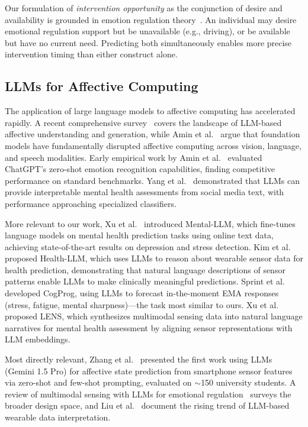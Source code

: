 \documentclass[screen,review,anonymous]{acmart}
\begin{document}
Our formulation of \emph{intervention opportunity} as the conjunction of desire and availability is grounded in emotion regulation theory~\cite{gross2015emotion_regulation, sheppes2015emotion_regulation, aldao2010emotion_regulation}. An individual may desire emotional regulation support but be unavailable (e.g., driving), or be available but have no current need. Predicting both simultaneously enables more precise intervention timing than either construct alone.

\subsection{LLMs for Affective Computing}

The application of large language models to affective computing has accelerated rapidly. A recent comprehensive survey~\cite{zhang2024affective_llm_survey} covers the landscape of LLM-based affective understanding and generation, while Amin et al.~\cite{amin2025affective_fm} argue that foundation models have fundamentally disrupted affective computing across vision, language, and speech modalities. Early empirical work by Amin et al.~\cite{amin2023llm_ema} evaluated ChatGPT's zero-shot emotion recognition capabilities, finding competitive performance on standard benchmarks. Yang et al.~\cite{yang2024llm_mental} demonstrated that LLMs can provide interpretable mental health assessments from social media text, with performance approaching specialized classifiers.

More relevant to our work, Xu et al.~\cite{xu2024mentalllm} introduced Mental-LLM, which fine-tunes language models on mental health prediction tasks using online text data, achieving state-of-the-art results on depression and stress detection. Kim et al.~\cite{kim2024health_llm} proposed Health-LLM, which uses LLMs to reason about wearable sensor data for health prediction, demonstrating that natural language descriptions of sensor patterns enable LLMs to make clinically meaningful predictions. Sprint et al.~\cite{sprint2025cogprog} developed CogProg, using LLMs to forecast in-the-moment EMA responses (stress, fatigue, mental sharpness)---the task most similar to ours. Xu et al.~\cite{xu2025lens} proposed LENS, which synthesizes multimodal sensing data into natural language narratives for mental health assessment by aligning sensor representations with LLM embeddings.

Most directly relevant, Zhang et al.~\cite{zhang2024llm_affect_sensing} presented the first work using LLMs (Gemini 1.5 Pro) for affective state prediction from smartphone sensor features via zero-shot and few-shot prompting, evaluated on $\sim$150 university students. A review of multimodal sensing with LLMs for emotional regulation~\cite{multimodal_sensing_llm_er2025} surveys the broader design space, and Liu et al.~\cite{liu2024rise_llm_wearable} document the rising trend of LLM-based wearable data interpretation.
\end{document}
